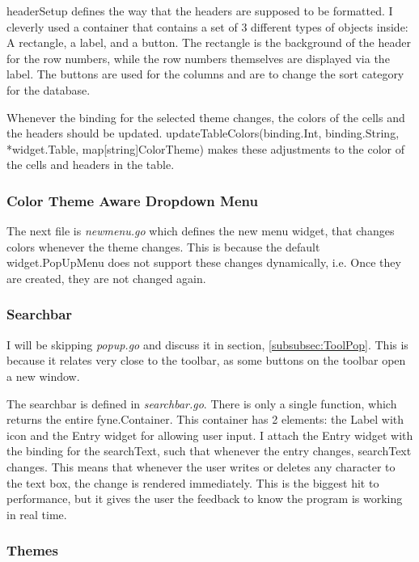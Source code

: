 headerSetup defines the way that the headers are supposed to
be formatted. I cleverly used a container that contains a set of 3
different types of objects inside: A rectangle, a label, and a button.
The rectangle is the background of the header for the row numbers,
while the row numbers themselves are displayed via the label. The
buttons are used for the columns and are to change the sort category
for the database.

Whenever the binding for the selected theme changes, the colors of
the cells and the headers should be updated.
updateTableColors(binding.Int, binding.String, *widget.Table,
map[string]ColorTheme) makes these adjustments to the color of the
cells and headers in the table.

\subsubsection{Color Theme Aware Dropdown Menu}

The next file is \textit{newmenu.go} which defines the new menu
widget, that changes colors whenever the theme changes.
This is because the default widget.PopUpMenu does not support these
changes dynamically, i.e. Once they are created, they are not changed
again.

\subsubsection{Searchbar}

I will be skipping \textit{popup.go} and discuss it in
section, \ref{subsubsec:ToolPop}. This is because it relates very
close to the toolbar, as some buttons on the toolbar open a new window.

The searchbar is defined in \textit{searchbar.go}. There is only a
single function, which returns the entire fyne.Container. This
container has 2 elements: the
Label with icon and the Entry widget for allowing user input.
I attach the Entry widget with the binding for the searchText, such
that whenever the entry changes, searchText changes.
This means that whenever the user writes or deletes any character to
the text box, the change is rendered immediately.
This is the biggest hit to
performance, but it gives the user the feedback to know the program
is working in real time.

\subsubsection{Themes}
\label{subsubsec:Themes}

